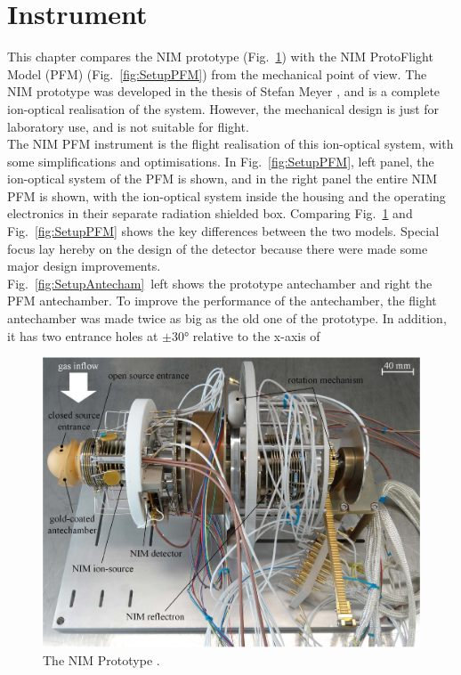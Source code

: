 \section{Instrument}\label{sec:setup}
	
	This chapter compares the NIM prototype (Fig.~\ref{fig:SetupProto}) with the NIM ProtoFlight Model (PFM) (Fig.~\ref{fig:SetupPFM}) from the mechanical point of view. The NIM prototype was developed in the thesis of Stefan Meyer \cite{Diss_Meyer}, and is a complete ion-optical realisation of the system. However, the mechanical design is just for laboratory use, and is not suitable for flight.\\
	The NIM PFM instrument is the flight realisation of this ion-optical system, with some simplifications and optimisations. In Fig.~\ref{fig:SetupPFM}, left panel, the ion-optical system of the PFM is shown, and in the right panel the entire NIM PFM is shown, with the ion-optical system inside the housing and the operating electronics in their separate radiation shielded box. Comparing Fig.~\ref{fig:SetupProto} and Fig.~\ref{fig:SetupPFM} shows the key differences between the two models. Special focus lay hereby on the design of the detector because there were made some major design improvements.\\
	Fig.~\ref{fig:SetupAntecham}~left shows the prototype antechamber and right the PFM antechamber. To improve the performance of the antechamber, the flight antechamber was made twice as big as the old one of the prototype. In addition, it has two entrance holes at $\pm$30° relative to the x-axis of 
	\begin{figure}[h] %
		\centering
		\includegraphics[width=\textwidth]{Setup/Prototype_totPic.jpg}
		\caption{The NIM Prototype \cite{Diss_Meyer}.}
		\label{fig:SetupProto}
	\end{figure}
